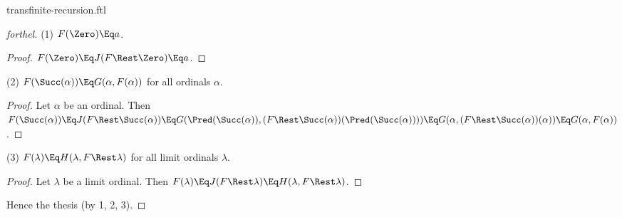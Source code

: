 \documentclass{stex}
\begin{document}
\begin{smodule}{transfinite-recursion.ftl}
\begin{proof}[forthel]
  (1) $F(\Zero) \Eq a$.
  \begin{proof}
    $F(\Zero)
      \Eq J(F \Rest \Zero)
      \Eq a$.
  \end{proof}

  (2) $F(\Succ(\alpha)) \Eq G(\alpha, F(\alpha))$ for all ordinals $\alpha$.
  \begin{proof}
    Let $\alpha$ be an ordinal.
    Then $F(\Succ(\alpha))
      \Eq J(F \Rest \Succ(\alpha))
      \Eq\linebreak G(\Pred(\Succ(\alpha)), (F \Rest \Succ(\alpha))(\Pred(\Succ(\alpha))))
      \Eq G(\alpha, (F \Rest \Succ(\alpha))(\alpha))
      \Eq\linebreak G(\alpha, F(\alpha))$.
  \end{proof}

  (3) $F(\lambda) \Eq H(\lambda, F \Rest \lambda)$ for all limit ordinals $\lambda$.
  \begin{proof}
    Let $\lambda$ be a limit ordinal.
    Then $F(\lambda)
      \Eq J(F \Rest \lambda)
      \Eq H(\lambda, F \Rest \lambda)$.
  \end{proof}

  Hence the thesis (by 1, 2, 3).
\end{proof}

\printbibliography
{}

\end{smodule}
\end{document}
